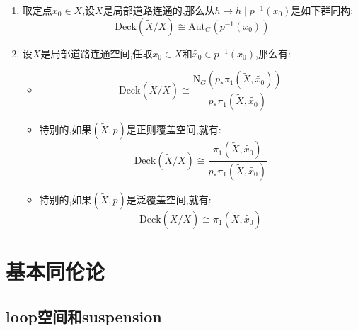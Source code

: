 \begin{enumerate}
\begin{proof}
		充分性,如果$\mathrm{Deck}(\widetilde{X}/X)$在$p^{-1}(x_0)$上的作用是单轨道的,任取$\widetilde{x_0},\widetilde{x_0}'\in p^{-1}(x_0)$,就存在Deck变换$h$使得$h(\widetilde{x_0})=\widetilde{x_0}'$,并且按照提升的唯一性,这样的$h$是同胚,于是有$h_*\pi_1(\widetilde{X},\widetilde{x_0})=\pi_1(\widetilde{X},\widetilde{x_0}')$.再从$p=ph$得到$p_*\pi_1(\widetilde{X},\widetilde{x_0})=p_*h_*\pi_1(\widetilde{X},\widetilde{x_0})=p_*\pi_1(\widetilde{X},\widetilde{x_1})$.这对任意的$\widetilde{x_0}'\in p^{-1}(x_0)$成立,说明$p_*\pi_1(\widetilde{X},\widetilde{x_0})$是$\pi_1(X,x_0)$的正规子群,所以$(\widetilde{X},p)$是正则覆盖空间.
	\end{proof}
    \item 取定点$x_0\in X$,设$X$是局部道路连通的,那么从$h\mapsto h\mid p^{-1}(x_0)$是如下群同构:
    $$\mathrm{Deck}(\widetilde{X}/X)\cong\mathrm{Aut}_G(p^{-1}(x_0))$$
    \item 设$X$是局部道路连通空间,任取$x_0\in X$和$\widetilde{x_0}\in p^{-1}(x_0)$,那么有:
    \begin{itemize}
    	\item $$\mathrm{Deck}(\widetilde{X}/X)\cong\frac{\mathrm{N}_G(p_*\pi_1(\widetilde{X},\widetilde{x_0}))}{p_*\pi_1(\widetilde{X},\widetilde{x_0})}$$
    	\item 特别的,如果$(\widetilde{X},p)$是正则覆盖空间,就有:
    	$$\mathrm{Deck}(\widetilde{X}/X)\cong\frac{\pi_1(\widetilde{X},\widetilde{x_0})}{p_*\pi_1(\widetilde{X},\widetilde{x_0})}$$
    	\item 特别的,如果$(\widetilde{X},p)$是泛覆盖空间,就有:
    	$$\mathrm{Deck}(\widetilde{X}/X)\cong\pi_1(\widetilde{X},\widetilde{x_0})$$
    \end{itemize}
\end{enumerate}

\newpage
\section{基本同伦论}
\subsection{loop空间和suspension}

